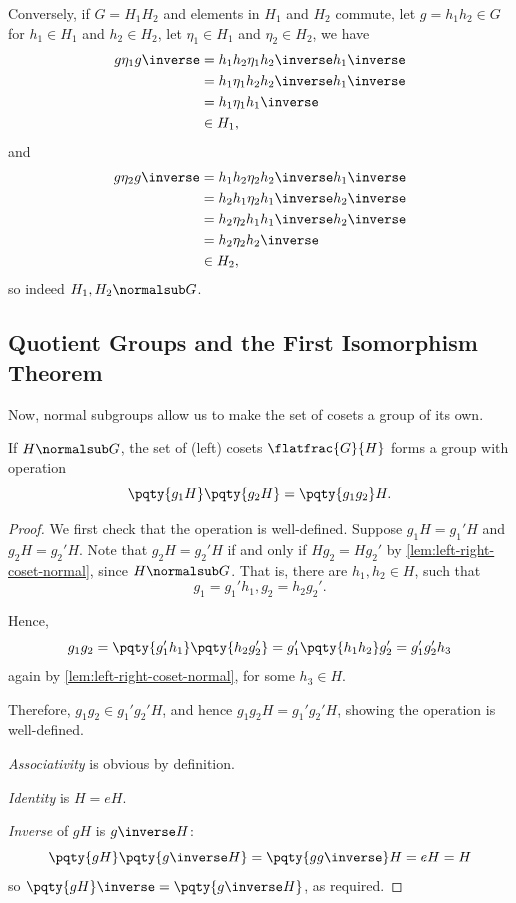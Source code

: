 Conversely, if \(G = H_1 H_2\) and elements in \(H_1\) and \(H_2\) commute, let \(g = h_1 h_2 \in G\) for \(h_1 \in H_1\) and \(h_2 \in H_2\), let \(\eta_1 \in H_1\) and \(\eta_2 \in H_2\), we have
\begin{align*}
    g \eta_1 g\inverse &= h_1 h_2 \eta_1 h_2\inverse h_1\inverse \\
    &= h_1 \eta_1 h_2 h_2\inverse h_1\inverse \\
    &= h_1 \eta_1 h_1\inverse \\
    &\in H_1,
\end{align*}
and
\begin{align*}
    g \eta_2 g\inverse &= h_1 h_2 \eta_2 h_2\inverse h_1\inverse \\
    &= h_2 h_1 \eta_2 h_1\inverse h_2\inverse \\
    &= h_2 \eta_2 h_1 h_1\inverse h_2\inverse \\
    &= h_2 \eta_2 h_2\inverse \\
    &\in H_2,
\end{align*}
so indeed \(H_1, H_2 \normalsub G\).

\subsection{Quotient Groups and the First Isomorphism Theorem}
\label{sec:quotient-groups-isomorphism-theorem}

Now, normal subgroups allow us to make the set of cosets a group of its own.

\begin{theorem}
    \label{thm:quotient-group}%
    If \(H \normalsub G\), the set of (left) cosets \(\flatfrac{G}{H}\) forms a group with operation
    \[
        \pqty{g_1 H} \pqty{g_2 H} = \pqty{g_1 g_2} H.
    \]
\end{theorem}

\begin{proof}
    We first check that the operation is well-defined. Suppose \(g_1 H = g_1' H\) and \(g_2 H = g_2' H\). Note that \(g_2 H = g_2' H\) if and only if \(H g_2 = H g_2'\) by \autoref{lem:left-right-coset-normal}, since \(H \normalsub G\). That is, there are \(h_1, h_2 \in H\), such that
    \[
        g_1 = g_1' h_1, g_2 = h_2 g_2'.
    \]

    Hence,
    \[
        g_1 g_2 = \pqty{g_1' h_1} \pqty{h_2 g_2'} = g_1' \pqty{h_1 h_2} g_2' = g_1' g_2' h_3
    \]
    again by \autoref{lem:left-right-coset-normal}, for some \(h_3 \in H\).

    Therefore, \(g_1 g_2 \in g_1' g_2' H\), and hence \(g_1 g_2 H = g_1' g_2' H\), showing the operation is well-defined.

    \emph{Associativity} is obvious by definition.

    \emph{Identity} is \(H = eH\).

    \emph{Inverse} of \(gH\) is \(g\inverse H\):
    \[
        \pqty{gH} \pqty{g\inverse H} = \pqty{g g\inverse} H = eH = H
    \]
    so \(\pqty{gH}\inverse = \pqty{g\inverse H}\), as required.
\end{proof}


